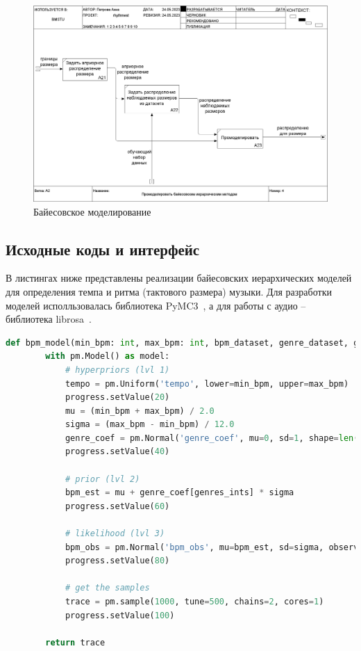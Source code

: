 \begin{figure}[h]
	\centering
	\includegraphics[scale=0.3]{inc/img/rhythm_idef/04_A2.png}
	\caption{Байесовское моделирование}
	\label{img:rhythm_3}
\end{figure}

\clearpage

\subsection{Исходные коды и интерфейс}

В листингах ниже представлены реализации байесовских иерархических моделей для определения темпа и ритма (тактового размера) музыки. Для разработки моделей исполльзовалась библиотека PyMC3~\cite{pymc3_docs}, а для работы с аудио -- библиотека librosa~\cite{librosa}.

\begin{lstlisting}[label={lst:bpmmodel}, caption={реализация байесовской модели для определения темпа}, language=python]
	def bpm_model(min_bpm: int, max_bpm: int, bpm_dataset, genre_dataset, genres_ints, progress):
		with pm.Model() as model:
			# hyperpriors (lvl 1)
			tempo = pm.Uniform('tempo', lower=min_bpm, upper=max_bpm)
			progress.setValue(20)
			mu = (min_bpm + max_bpm) / 2.0
			sigma = (max_bpm - min_bpm) / 12.0
			genre_coef = pm.Normal('genre_coef', mu=0, sd=1, shape=len(genre_dataset.unique()))
			progress.setValue(40)
	
			# prior (lvl 2)
			bpm_est = mu + genre_coef[genres_ints] * sigma
			progress.setValue(60)
	
			# likelihood (lvl 3)
			bpm_obs = pm.Normal('bpm_obs', mu=bpm_est, sd=sigma, observed=bpm_dataset)
			progress.setValue(80)
	
			# get the samples
			trace = pm.sample(1000, tune=500, chains=2, cores=1)
			progress.setValue(100)
	
		return trace
\end{lstlisting}


